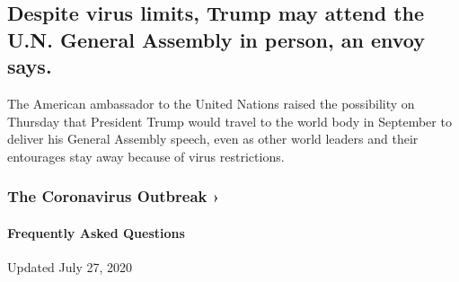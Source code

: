 \hypertarget{despite-virus-limits-trump-may-attend-the-un-general-assembly-in-person-an-envoy-says}{%
\subsection{Despite virus limits, Trump may attend the U.N. General
Assembly in person, an envoy
says.}\label{despite-virus-limits-trump-may-attend-the-un-general-assembly-in-person-an-envoy-says}}

The American ambassador to the United Nations raised the possibility on
Thursday that President Trump would travel to the world body in
September to deliver his General Assembly speech, even as other world
leaders and their entourages stay away because of virus restrictions.

\href{https://www.nytimes3xbfgragh.onion/news-event/coronavirus?action=click\&pgtype=Article\&state=default\&region=MAIN_CONTENT_3\&context=storylines_faq}{}

\hypertarget{the-coronavirus-outbreak-}{%
\subsubsection{The Coronavirus Outbreak
›}\label{the-coronavirus-outbreak-}}

\hypertarget{frequently-asked-questions}{%
\paragraph{Frequently Asked
Questions}\label{frequently-asked-questions}}

Updated July 27, 2020

